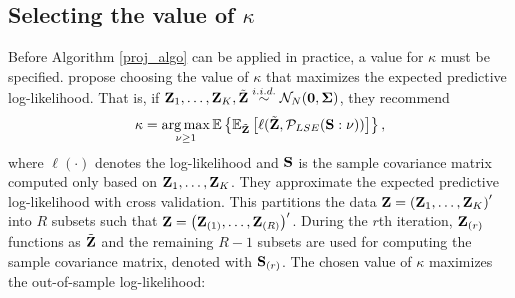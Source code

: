 \documentclass[11pt]{article}
\newcommand{\E}{\mathbb{E}}
\DeclareMathOperator*{\argmax}{arg\,max}
\theoremstyle{definition}
\theoremstyle{definition}
\def\bSigma{{\bf \Sigma}}
\def\Z{{\bf Z}}
\def\SS{{\bf S}}
\def\E{{\mathbb E}}
\begin{document}
\subsection{Selecting the value of $\kappa$}
\label{condSelection}
Before Algorithm \ref{proj_algo} can be applied in practice, a value for $\kappa$ must be specified.
 \cite{won2006maximum} propose choosing the value of $\kappa$ that maximizes the expected predictive log-likelihood. That is, if $\Z_1, \dots, \Z_K,  \tilde{\Z}\stackrel{i.i.d.}{\sim} \mathcal{N}_{N}(\boldsymbol{0}, \bSigma)$, they recommend $$\kappa = \argmax_{\nu \geq 1} \E \left\{ \E_{\tilde{\Z}} \left[  \ell(\tilde{\Z},  \mathcal{P}_{LSE}(\SS : \nu)) \right] \right\},$$ where $\ell(\cdot)$ denotes the log-likelihood  and $\SS$ is the sample covariance matrix computed only based on $\Z_1, \dots, \Z_K$. They approximate the expected predictive log-likelihood with cross validation. This partitions the data $\Z = \left(\Z_{1}, \dots, \Z_{K}\right)'$ into $R$ subsets such that  $\Z = \left(\Z_{(1)}, \dots, \Z_{(R)}\right)'$. During the $r$th iteration, $\Z_{(r)}$ functions as $\tilde{\Z}$ and the remaining $R-1$ subsets are used for computing the sample covariance matrix, denoted  with $\SS_{(r)}$. 
The chosen value of $\kappa$ maximizes the out-of-sample log-likelihood:
\end{document}
